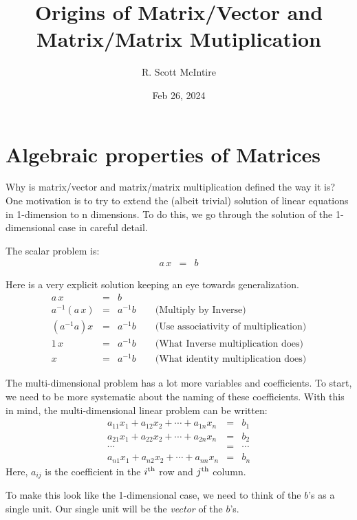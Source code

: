 \documentclass{article}
\title{Origins of Matrix/Vector and Matrix/Matrix Mutiplication}
\author{R. Scott McIntire}
\date{Feb 26, 2024}
\begin{document}
\maketitle


\section{Algebraic properties of Matrices}
Why is matrix/vector and matrix/matrix multiplication defined the way it is?
One motivation is to try to extend the (albeit trivial) solution of linear
equations in 1-dimension to n dimensions. To do this, we go through the solution
of the 1-dimensional case in careful detail.

The scalar problem is:
\begin{eqnarray}
  a \, x & = & b \label{scalar-problem}
\end{eqnarray}

Here is a very explicit solution keeping an eye towards generalization.
\begin{eqnarray}
  a \, x & = & b \\
  a^{-1} ( a \, x ) & = & a^{-1} b \quad \quad \text{(Multiply by Inverse)} \label{inv} \\
  (a^{-1} a) x & = & a^{-1} b \quad \quad \text{(Use associativity of multiplication)} \label{assoc} \\
  1 \, x & = & a^{-1} b \quad \quad \text{(What Inverse multiplication does)} \label{inv-mult} \\
  x & = & a^{-1} b \quad \quad \text{(What identity multiplication does)} \label{identity}
\end{eqnarray}

The multi-dimensional problem has a lot more variables and coefficients.
To start, we need to be more systematic about the naming of these coefficients.
With this in mind, the multi-dimensional linear problem can be written:
\begin{eqnarray*}
  a_{11} x_1 + a_{12} x_2 + \cdots + a_{1n} x_n & = & b_1 \\
  a_{21} x_1 + a_{22} x_2 + \cdots + a_{2n} x_n & = & b_2 \\
  \cdots & = & \cdots \\
  a_{n1} x_1 + a_{n2} x_2 + \cdots + a_{nn} x_n & = & b_n 
\end{eqnarray*}
Here, $a_{ij}$ is the coefficient in the $i^{\rm th}$ row and $j^{\rm th}$ column.


To make this look like the 1-dimensional case, we need to think of the $b$'s as
a single unit. Our single unit will be the {\em vector\/} of the $b$'s.
\end{document}

